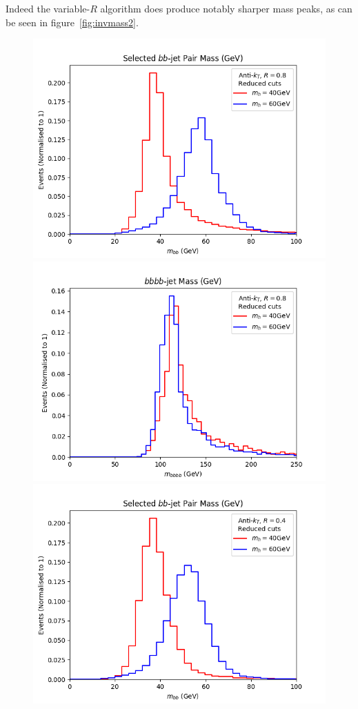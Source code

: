 Indeed the variable-\(R\) algorithm does produce notably sharper mass peaks,
as can be seen in figure~\ref{fig:invmass2}.

\begin{figure}[htb!]
	\includegraphics[scale=0.5]{plots/bbmass_AK8_lowptcut.png}
	\includegraphics[scale=0.5]{plots/bbbbmass_AK8_lowptcut.png}
	\includegraphics[scale=0.5]{plots/bbmass_AK4_lowptcut.png}

\end{figure}
